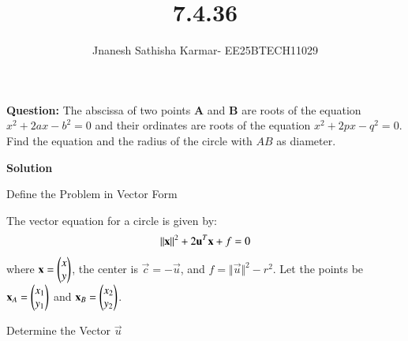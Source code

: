 \documentclass[journal]{IEEEtran}
\theoremstyle{remark}
\begin{document}
\setlength{\abovedisplayskip}{0pt}
\setlength{\belowdisplayskip}{0pt}
\setlength{\abovedisplayshortskip}{0pt}
\setlength{\belowdisplayshortskip}{0pt}

\onecolumn

\title{7.4.36}
\author{Jnanesh Sathisha Karmar- EE25BTECH11029}
\maketitle
\renewcommand{\thefigure}{\theenumi}
\renewcommand{\thetable}{\theenumi}
\noindent
\textbf{Question:} The abscissa of two points \textbf{A} and \textbf{B} are roots of the equation $x^2 + 2ax - b^2 = 0$ and their ordinates are roots of the equation $x^2 + 2px - q^2 = 0$. Find the equation and the radius of the circle with $AB$ as diameter.

\textbf{Solution}

 Define the Problem in Vector Form

The vector equation for a circle is given by:
\begin{align*}
    \left\lVert\mathbf{x}\right\rVert^2 + 2\mathbf{u}^T \mathbf{x} + f = 0
\end{align*}
where $\mathbf{x} = \begin{pmatrix}x \\ y\end{pmatrix}$, the center is $\vec{c} = -\vec{u}$, and $f = \Vert \vec{u} \Vert^2 - r^2$.
Let the points be $\mathbf{x}_A = \begin{pmatrix}x_1 \\ y_1\end{pmatrix}$ and $\mathbf{x}_B = \begin{pmatrix}x_2 \\ y_2\end{pmatrix}$.

 Determine the Vector $\vec{u}$
\end{document}
